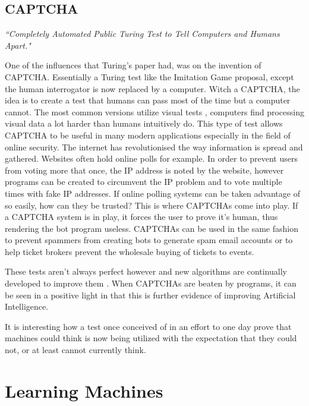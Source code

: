 \documentclass{scrartcl}
\begin{document}
\subsection{CAPTCHA}

\textit{\textquotedblleft Completely Automated Public Turing Test to Tell Computers and Humans Apart."}

One of the influences that Turing's paper had, was on the invention of CAPTCHA. Essentially a Turing test like the Imitation Game proposal, except the human interrogator is now replaced by a computer\cite{von2004telling:6}. Witch a CAPTCHA, the idea is to create a test that humans can pass most of the time but a computer cannot. The most common versions utilize visual tests \cite{fischer2006visual:7}, computers find processing visual data a lot harder than humans intuitively do. This type of test allows CAPTCHA to be useful in many modern applications especially in the field of online security. The internet has revolutionised the way information is spread and gathered. Websites often hold online polls for example. In order to prevent users from voting more that once, the IP address is noted by the website, however programs can be created to circumvent the IP problem and to vote multiple times with fake IP addresses. If online polling systems can be taken advantage of so easily, how can they be trusted?  This is where CAPTCHAs come into play. If a CAPTCHA system is in play, it forces the user to prove it's human, thus rendering the bot program useless. CAPTCHAs can be used in the same fashion to prevent spammers from creating bots to generate spam email accounts or to help ticket brokers prevent the wholesale buying of tickets to events.

These tests aren't always perfect however and new algorithms are continually developed to improve them \cite{mori2003recognizing:8}. When CAPTCHAs are beaten by programs, it can be seen in a positive light in that this is further evidence of improving Artificial Intelligence.

It is interesting how a test once conceived of in an effort to one day prove that machines could think is now being utilized with the expectation that they could not, or at least cannot currently think. 




\section{Learning Machines}
\end{document}
